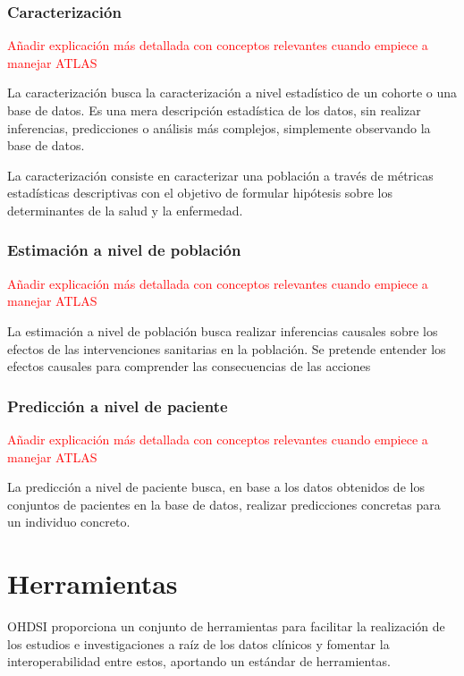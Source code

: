 \subsubsection{Caracterización}

\textcolor{red}{Añadir explicación más detallada con conceptos relevantes cuando empiece a manejar ATLAS}

La caracterización busca la caracterización a nivel estadístico de un cohorte o una base de datos. Es una mera descripción estadística de los datos, sin realizar inferencias, predicciones o análisis más complejos, simplemente observando la base de datos.

La caracterización consiste en caracterizar una población a través de métricas estadísticas descriptivas con el objetivo de formular hipótesis sobre los determinantes de la salud y la enfermedad.

\subsubsection{Estimación a nivel de población}

\textcolor{red}{Añadir explicación más detallada con conceptos relevantes cuando empiece a manejar ATLAS}

La estimación a nivel de población busca realizar inferencias causales sobre los efectos de las intervenciones sanitarias en la población. Se pretende entender los efectos causales para comprender las consecuencias de las acciones

\subsubsection{Predicción a nivel de paciente}

\textcolor{red}{Añadir explicación más detallada con conceptos relevantes cuando empiece a manejar ATLAS}

La predicción a nivel de paciente busca, en base a los datos obtenidos de los conjuntos de pacientes en la base de datos, realizar predicciones concretas para un individuo concreto.

\section{Herramientas} \label{sec:05herramientas}

OHDSI proporciona un conjunto de herramientas para facilitar la realización de los estudios e investigaciones a raíz de los datos clínicos y fomentar la interoperabilidad entre estos, aportando un estándar de herramientas. 

